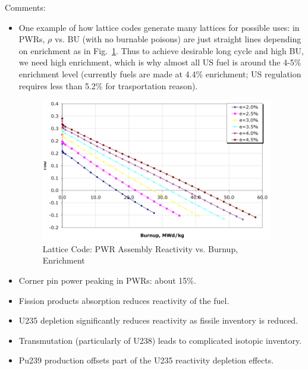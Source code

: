 \documentclass{school-22.211-notes}
\begin{document}
Comments: 
\begin{itemize}
\item One example of how lattice codes generate many lattices for possible uses: in PWRs, $\rho$ vs. BU (with no burnable poisons) are just straight lines depending on enrichment as in Fig.~\ref{lattice-rho-vs-BU}. Thus to achieve desirable long cycle and high BU, we need high enrichment, which is why almost all US fuel is around the 4-5\% enrichment level (currently fuels are made at 4.4\% enrichment; US regulation requires less than 5.2\% for trasportation reason).  
\begin{figure}[ht]
  \centering
  \includegraphics[width=4in]{images/design/lattice-rho-vs-BU.png}
  \caption{Lattice Code: PWR Assembly Reactivity vs. Burnup, Enrichment} \label{lattice-rho-vs-BU}
\end{figure}
\item Corner pin power peaking in PWRs: about 15\%.
\item Fission products absorption reduces reactivity of the fuel. 
\item U235 depletion significantly reduces reactivity as fissile inventory is reduced. 
\item Transmutation (particularly of U238) leads to complicated isotopic inventory. 
\item Pu239 production offsets part of the U235 reactivity depletion effects. 
\end{itemize}
\end{document}
